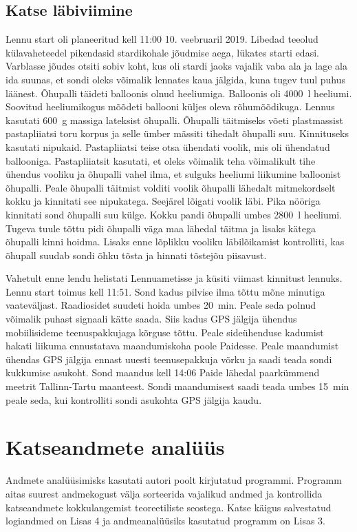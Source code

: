 \documentclass{trkut}%
\begin{document}
\section{Katse läbiviimine}
Lennu start oli planeeritud kell 11:00 10. veebruaril 2019. Libedad teeolud külavaheteedel pikendasid stardikohale jõudmise aega, lükates starti edasi. Varblasse jõudes otsiti sobiv koht, kus oli stardi jaoks vajalik vaba ala ja lage ala ida suunas, et sondi oleks võimalik lennates kaua jälgida, kuna tugev tuul puhus läänest. Õhupalli täideti balloonis olnud heeliumiga. Balloonis oli \SI{4000}{l} heeliumi. Soovitud heeliumikogus mõõdeti ballooni küljes oleva rõhumõõdikuga. Lennus kasutati \SI{600}{g} massiga lateksist õhupalli. Õhupalli täitmiseks võeti plastmassist pastapliiatsi toru korpus ja selle ümber mässiti tihedalt õhupalli suu. Kinnituseks kasutati nipukaid. Pastapliiatsi teise otsa ühendati voolik, mis oli ühendatud ballooniga. Pastapliiatsit kasutati, et oleks võimalik teha võimalikult tihe ühendus vooliku ja õhupalli vahel ilma, et sulguks heeliumi liikumine balloonist õhupalli. Peale õhupalli täitmist volditi voolik õhupalli lähedalt mitmekordselt kokku ja kinnitati see nipukatega. Seejärel lõigati voolik läbi. Pika nööriga kinnitati sond õhupalli suu külge. Kokku pandi õhupalli umbes \SI{2800}{l} heeliumi. Tugeva tuule tõttu pidi õhupalli väga maa lähedal täitma ja lisaks kätega õhupalli kinni hoidma. Lisaks enne lõplikku vooliku läbilõikamist kontrolliti, kas õhupall suudab sondi õhku tõsta ja hinnati tõstejõu piisavust.

Vahetult enne lendu helistati Lennuametisse ja küsiti viimast kinnitust lennuks. Lennu start toimus kell 11:51. Sond kadus pilvise ilma tõttu mõne minutiga vaateväljast. Raadiosidet suudeti hoida umbes \SI{20}{min}. Peale seda polnud võimalik puhast signaali kätte saada. Siis kadus GPS jälgija ühendus mobiilisideme teenuspakkujaga kõrguse tõttu. Peale sideühenduse kadumist hakati liikuma ennustatava maandumiskoha poole Paidesse. Peale maandumist ühendas GPS jälgija ennast uuesti teenusepakkuja võrku ja saadi teada sondi kukkumise asukoht. Sond maandus kell 14:06 Paide lähedal paarkümmend meetrit Tallinn-Tartu maanteest. Sondi maandumisest saadi teada umbes \SI{15}{min} peale seda, kui kontrolliti sondi asukohta GPS jälgija kaudu.






\chapter{Katseandmete analüüs}
Andmete analüüsimisks kasutati autori poolt kirjutatud programmi. Programm aitas suurest andmekogust välja sorteerida vajalikud andmed ja kontrollida katseandmete kokkulangemist teoreetiliste seostega. Katse käigus salvestatud logiandmed on Lisas 4 ja andmeanalüüsiks kasutatud programm on Lisas 3.
\end{document}
